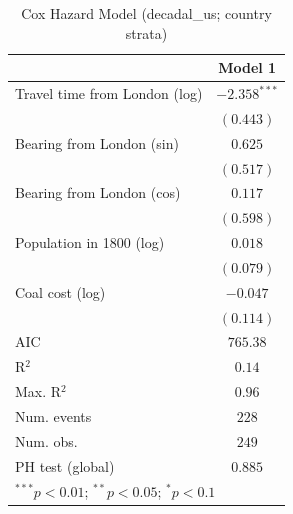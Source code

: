 
\begin{table}
\begin{center}
\begin{tabular}{l c}
\hline
 & Model 1 \\
\hline
Travel time from London (log) & $-2.358^{***}$ \\
 & $(0.443)$ \\
Bearing from London (sin) & $0.625$ \\
 & $(0.517)$ \\
Bearing from London (cos) & $0.117$ \\
 & $(0.598)$ \\
Population in 1800 (log) & $0.018$ \\
 & $(0.079)$ \\
Coal cost (log) & $-0.047$ \\
 & $(0.114)$ \\
\hline
AIC              & $765.38$ \\
R$^2$            & $0.14$ \\
Max. R$^2$       & $0.96$ \\
Num. events      & $228$ \\
Num. obs.        & $249$ \\
PH test (global) & $0.885$ \\
\hline
\multicolumn{2}{l}{\scriptsize{$^{***}p<0.01$; $^{**}p<0.05$; $^{*}p<0.1$}}
\end{tabular}
\caption{Cox Hazard Model (decadal\_us; country strata)}
\label{tab:cox_serious_strata_decadal_us}
\end{center}
\end{table}
